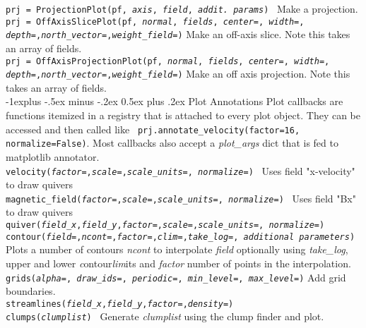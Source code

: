 \documentclass[10pt,landscape]{article}
\makeatletter
\renewcommand{\subsection}{\@startsection{subsection}{2}{0mm}%
                                {-1explus -.5ex minus -.2ex}%
                                {0.5ex plus .2ex}%
                                {\normalfont\normalsize\bfseries}}
\makeatother
\begin{document}
\begin{multicols}{3}
\texttt{prj = ProjectionPlot(pf, {\it axis}, {\it field}, {\it addit. params})} \textemdash\ Make a projection. \\
\texttt{prj = OffAxisSlicePlot(pf, {\it normal}, {\it fields}, {\it center=}, {\it width=}, {\it depth=},{\it north\_vector=},{\it weight\_field=})} \textemdash Make an off-axis slice. Note this takes an array of fields. \\
\texttt{prj = OffAxisProjectionPlot(pf, {\it normal}, {\it fields}, {\it center=}, {\it width=}, {\it depth=},{\it north\_vector=},{\it weight\_field=})} \textemdash Make an off axis projection. Note this takes an array of fields. \\

\subsection{Plot Annotations}
Plot callbacks are functions itemized in a registry that is attached to every plot object. They can be accessed and then called like \texttt{ prj.annotate\_velocity(factor=16, normalize=False)}. Most callbacks also accept a {\it plot\_args} dict that is fed to matplotlib annotator. \\
\texttt{velocity({\it factor=},{\it scale=},{\it scale\_units=}, {\it normalize=})} \textemdash\ Uses field "x-velocity" to draw quivers\\
\texttt{magnetic\_field({\it factor=},{\it scale=},{\it scale\_units=}, {\it normalize=})} \textemdash\ Uses field "Bx" to draw quivers\\
\texttt{quiver({\it field\_x},{\it field\_y},{\it factor=},{\it scale=},{\it scale\_units=}, {\it normalize=})} \\
\texttt{contour({\it field=},{\it ncont=},{\it factor=},{\it clim=},{\it take\_log=}, {\it additional parameters})} \textemdash Plots a number of contours {\it ncont} to interpolate {\it field} optionally using {\it take\_log}, upper and lower {\it c}ontour{\it lim}its and {\it factor} number of points in the interpolation.\\
\texttt{grids({\it alpha=}, {\it draw\_ids=}, {\it periodic=}, {\it min\_level=}, {\it max\_level=})} \textemdash Add grid boundaries. \\
\texttt{streamlines({\it field\_x},{\it field\_y},{\it factor=},{\it density=})}\\
\texttt{clumps({\it clumplist})} \textemdash\ Generate {\it clumplist} using the clump finder and plot. \\

\end{multicols}
\end{document}
